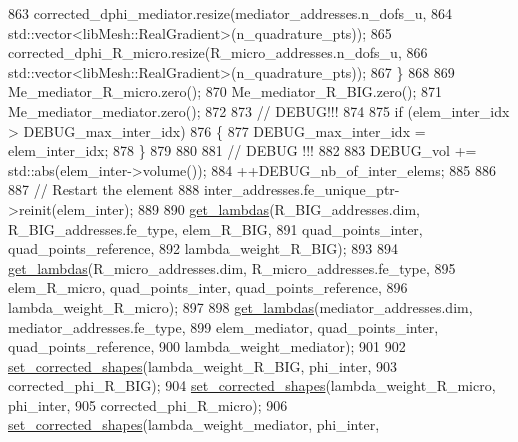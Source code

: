 \begin{DoxyCode}
863                     corrected\_dphi\_mediator.resize(mediator\_addresses.n\_dofs\_u,
864                             std::vector<libMesh::RealGradient>(n\_quadrature\_pts));
865                     corrected\_dphi\_R\_micro.resize(R\_micro\_addresses.n\_dofs\_u,
866                             std::vector<libMesh::RealGradient>(n\_quadrature\_pts));
867             \}
868 
869             Me\_mediator\_R\_micro.zero();
870             Me\_mediator\_R\_BIG.zero();
871             Me\_mediator\_mediator.zero();
872 
873             \textcolor{comment}{// DEBUG!!!}
874 
875                 \textcolor{keywordflow}{if} (elem\_inter\_idx > DEBUG\_max\_inter\_idx)
876                 \{
877                     DEBUG\_max\_inter\_idx = elem\_inter\_idx;
878                 \}
879 
880 
881             \textcolor{comment}{// DEBUG !!!}
882 
883                 DEBUG\_vol += std::abs(elem\_inter->volume());
884                 ++DEBUG\_nb\_of\_inter\_elems;
885 
886 
887             \textcolor{comment}{// Restart the element}
888             inter\_addresses.fe\_unique\_ptr->reinit(elem\_inter);
889 
890             \hyperlink{classcarl_1_1assemble__coupling__matrices_a27ee998dbd1a87b1ce4d1e9c9e515e43}{get\_lambdas}(R\_BIG\_addresses.dim, R\_BIG\_addresses.fe\_type, elem\_R\_BIG,
891                     quad\_points\_inter, quad\_points\_reference,
892                     lambda\_weight\_R\_BIG);
893 
894             \hyperlink{classcarl_1_1assemble__coupling__matrices_a27ee998dbd1a87b1ce4d1e9c9e515e43}{get\_lambdas}(R\_micro\_addresses.dim, R\_micro\_addresses.fe\_type,
895                     elem\_R\_micro, quad\_points\_inter, quad\_points\_reference,
896                     lambda\_weight\_R\_micro);
897 
898             \hyperlink{classcarl_1_1assemble__coupling__matrices_a27ee998dbd1a87b1ce4d1e9c9e515e43}{get\_lambdas}(mediator\_addresses.dim, mediator\_addresses.fe\_type,
899                     elem\_mediator, quad\_points\_inter, quad\_points\_reference,
900                     lambda\_weight\_mediator);
901 
902             \hyperlink{classcarl_1_1assemble__coupling__matrices_a677a3527845b3503cc5f5daa8de63864}{set\_corrected\_shapes}(lambda\_weight\_R\_BIG, phi\_inter,
903                     corrected\_phi\_R\_BIG);
904             \hyperlink{classcarl_1_1assemble__coupling__matrices_a677a3527845b3503cc5f5daa8de63864}{set\_corrected\_shapes}(lambda\_weight\_R\_micro, phi\_inter,
905                     corrected\_phi\_R\_micro);
906             \hyperlink{classcarl_1_1assemble__coupling__matrices_a677a3527845b3503cc5f5daa8de63864}{set\_corrected\_shapes}(lambda\_weight\_mediator, phi\_inter,

\end{DoxyCode}
